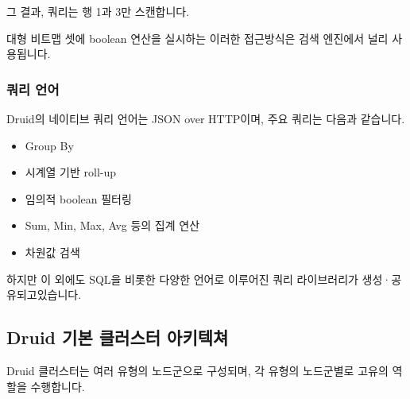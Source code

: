 \documentclass[letterpaper,10pt,english]{sphinxmanual}
\begin{document}
그 결과, 쿼리는 행 1과 3만 스캔합니다.

대형 비트맵 셋에 boolean 연산을 실시하는 이러한 접근방식은 검색 엔진에서 널리 사용됩니다.


\subsubsection{쿼리 언어}
\label{\detokenize{discovery/part01/druid_features:id5}}
Druid의 네이티브 쿼리 언어는 JSON over HTTP이며, 주요 쿼리는 다음과 같습니다.
\begin{itemize}
\item {} 
Group By

\item {} 
시계열 기반 roll-up

\item {} 
임의적 boolean 필터링

\item {} 
Sum, Min, Max, Avg 등의 집계 연산

\item {} 
차원값 검색

\end{itemize}

하지만 이 외에도 SQL을 비롯한 다양한 언어로 이루어진 쿼리 라이브러리가 생성·공유되고있습니다.


\subsection{Druid 기본 클러스터 아키텍쳐}
\label{\detokenize{discovery/part01/druid_nodes:druid}}\label{\detokenize{discovery/part01/druid_nodes::doc}}
Druid 클러스터는 여러 유형의 노드군으로 구성되며, 각 유형의 노드군별로 고유의 역할을 수행합니다.
\begin{quote}

\begin{figure}[H]
\centering

\noindent{}
\end{figure}
\end{quote}
\end{document}
